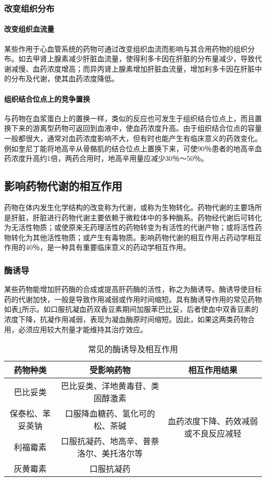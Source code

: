 \subsubsection{改变组织分布}
\paragraph{改变组织血流量}

某些作用于心血管系统的药物可通过改变组织血流而影响与其合用药物的组织分布。如去甲肾上腺素减少肝脏血流量，使得利多卡因在肝脏的分布量减少，导致代谢减慢、血药浓度增高；而异丙肾上腺素增加肝脏血流量，增加利多卡因在肝脏中的分布及代谢，使其血药浓度降低。
\paragraph{组织结合位点上的竞争置换}

与药物在血浆蛋白上的置换一样，类似的反应也可发生于组织结合位点上，而且置换下来的游离型药物可返回到血液中，使血药浓度升高。由于组织结合位点的容量一般都很大，通常对血药浓度影响不大，但有时也能产生有临床意义的药效变化。例如奎尼丁能将地高辛从骨骼肌的结合位点上置换下来，可使90％患者的地高辛血药浓度升高约1倍，两药合用时，地高辛用量应减少30％～50％。

\subsection{影响药物代谢的相互作用}

药物在体内发生化学结构的改变称为代谢，或称为生物转化。药物代谢的主要场所是肝脏，肝脏进行药物代谢主要依赖于微粒体中的多种酶系。药物经代谢后可转化为无活性物质；或使原来无药理活性的药物转变为有活性的代谢产物；或将活性药物转化为其他活性物质；或产生有毒物质。影响药物代谢的相互作用占药动学相互作用的40％，是一种具有重要临床意义的药动学相互作用。

\subsubsection{酶诱导}

某些药物能增加肝药酶的合成或提高肝药酶的活性，称之为酶诱导。酶诱导使目标药的代谢加快，一般是导致作用减弱或作用时间缩短。具有酶诱导作用的常见药物如表\ref{tab4-2}所示。如口服抗凝血药双香豆素期间加服苯巴比妥，后者使血中双香豆素的浓度下降，抗凝作用减弱，表现为凝血酶原时间缩短。因此，如果这两类药物合用，必须应用较大剂量才能维持其治疗效应。

\begin{longtable}{ccc}
    \caption{常见的酶诱导及相互作用}
    \label{tab4-2}\\
    \toprule
    药物种类 & 受影响药物 & 相互作用结果\tabularnewline
\midrule
巴比妥类 & 巴比妥类、洋地黄毒苷、类固醇激素& \multirow{4}{3cm}{血药浓度下降、药效减弱或不良反应减轻}\tabularnewline             
保泰松、苯妥英钠 & 口服降血糖药、氢化可的松、茶碱 & ~\tabularnewline
利福霉素 & 口服抗凝药、地高辛、普萘洛尔、美托洛尔等 & ~\tabularnewline
灰黄霉素 & 口服抗凝药 & ~\tabularnewline
\bottomrule
\end{longtable}





